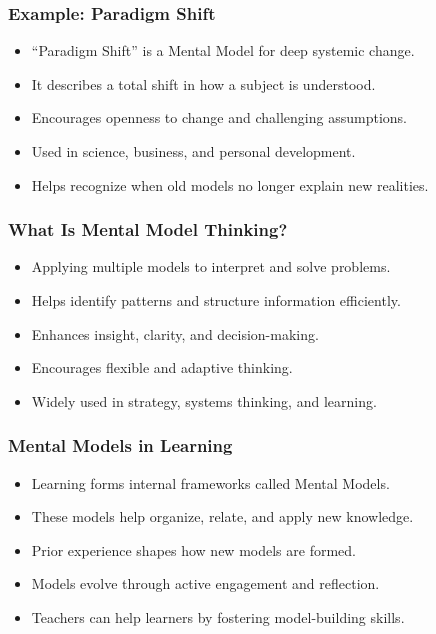 \begin{frame}[fragile]\frametitle{Example: Paradigm Shift}
      \begin{itemize}
        \item ``Paradigm Shift'' is a Mental Model for deep systemic change.
        \item It describes a total shift in how a subject is understood.
        \item Encourages openness to change and challenging assumptions.
        \item Used in science, business, and personal development.
        \item Helps recognize when old models no longer explain new realities.
      \end{itemize}
\end{frame}

\begin{frame}[fragile]\frametitle{What Is Mental Model Thinking?}
      \begin{itemize}
        \item Applying multiple models to interpret and solve problems.
        \item Helps identify patterns and structure information efficiently.
        \item Enhances insight, clarity, and decision-making.
        \item Encourages flexible and adaptive thinking.
        \item Widely used in strategy, systems thinking, and learning.
      \end{itemize}
\end{frame}

\begin{frame}[fragile]\frametitle{Mental Models in Learning}
      \begin{itemize}
        \item Learning forms internal frameworks called Mental Models.
        \item These models help organize, relate, and apply new knowledge.
        \item Prior experience shapes how new models are formed.
        \item Models evolve through active engagement and reflection.
        \item Teachers can help learners by fostering model-building skills.
      \end{itemize}
\end{frame}

